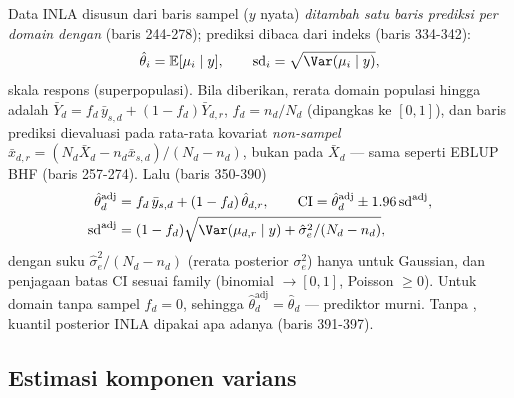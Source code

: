 Data INLA disusun dari baris sampel ($y$ nyata) \emph{ditambah satu baris
prediksi per domain dengan}  (baris 244-278); prediksi dibaca dari
indeks  (baris 334-342):
\begin{equation}
  \hat\theta_i=\mathbb E[\mu_i\mid y],\qquad
  \mathrm{sd}_i=\sqrt{\Var(\mu_i\mid y)},
  \label{eq:hbunit-pred}
\end{equation}
skala respons (superpopulasi). Bila  diberikan, rerata
domain populasi hingga adalah
$\bar Y_d=f_d\,\bar y_{s,d}+(1-f_d)\bar Y_{d,r}$, $f_d=n_d/N_d$ (dipangkas ke
$[0,1]$), dan baris prediksi dievaluasi pada rata-rata kovariat
\emph{non-sampel} $\bar x_{d,r}=(N_d\bar X_d-n_d\bar x_{s,d})/(N_d-n_d)$,
bukan pada $\bar X_d$ --- sama seperti EBLUP BHF (baris 257-274). Lalu
(baris 350-390)
\begin{equation}
\begin{aligned}
  \hat\theta_d^{\text{adj}}&=f_d\,\bar y_{s,d}+(1-f_d)\,\hat\theta_{d,r},
  \qquad
  \mathrm{CI}=\hat\theta_d^{\text{adj}}\pm1.96\,\mathrm{sd}^{\text{adj}},\\
  \mathrm{sd}^{\text{adj}}&=(1-f_d)\sqrt{\Var(\mu_{d,r}\mid y)+\hat\sigma_e^2/(N_d-n_d)},
\end{aligned}
  \label{eq:hbunit-fpc}
\end{equation}
dengan suku $\hat\sigma_e^2/(N_d-n_d)$ (rerata posterior $\sigma_e^2$) hanya
untuk Gaussian, dan penjagaan batas CI sesuai family (binomial $\to[0,1]$,
Poisson $\ge0$). Untuk domain tanpa sampel $f_d=0$, sehingga
$\hat\theta_d^{\text{adj}}=\hat\theta_d$ --- prediktor murni. Tanpa
, kuantil posterior INLA dipakai apa adanya (baris
391-397).


\subsection{Estimasi komponen varians}\label{sec:hbunit-varians}

